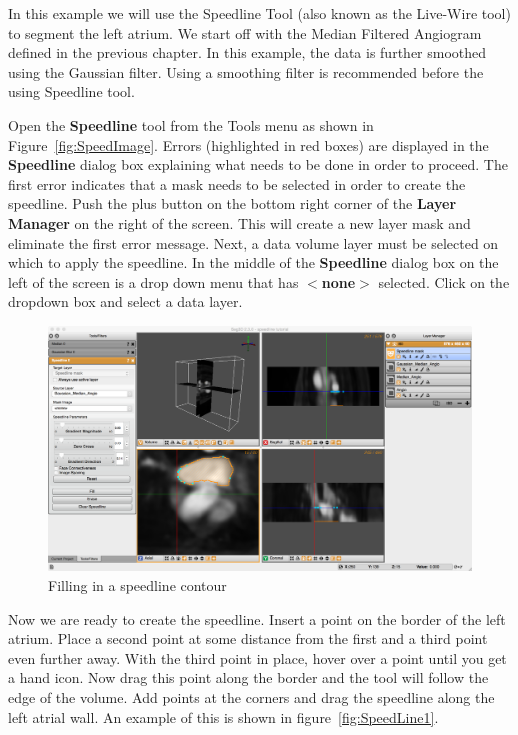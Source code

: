 \documentclass[fleqn,11pt,openany]{book}
\begin{document}
In this example we will use the Speedline Tool (also known as the Live-Wire tool) to segment the left atrium. We start off with the Median Filtered Angiogram defined in the previous chapter. In this example, the data is further smoothed using the Gaussian filter. Using a smoothing filter is recommended before the using Speedline tool.

Open  the {\bf Speedline} tool from the Tools menu as shown in Figure~\ref{fig:SpeedImage}. Errors (highlighted in red boxes) are displayed in the {\bf Speedline} dialog box explaining what needs to be done in order to proceed. The first error indicates that a mask needs to be selected in order to create the speedline. Push the plus button on the bottom right corner of the {\bf Layer Manager} on the right of the screen. This will create a new layer mask and eliminate the first error message. Next, a data volume layer must be selected on which to apply the speedline. In the middle of the {\bf Speedline} dialog box on the left of the screen is a drop down menu that has {\bf $<$none$>$} selected. Click on the dropdown box and select a data layer.

\begin{figure}
\includegraphics[width=\textwidth]{Seg3DTutorial_figures/SpeedlineFill.png}
\caption{Filling in a speedline contour}\label{fig:SpeedLine2}
\end{figure}

Now we are ready to create the speedline. Insert a point on the border of the left atrium.  Place a second point at some distance from the first and a third point even further away. With the third point in place, hover over a point until you get a hand icon. Now drag this point along the border and the tool will follow the edge of the volume. Add points at the corners and drag the speedline along the left atrial wall. An example of this is shown in figure~\ref{fig:SpeedLine1}. 
\end{document}
